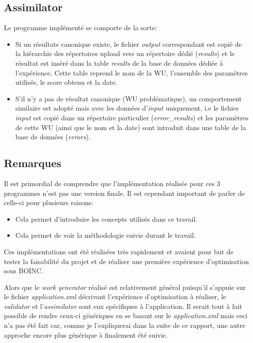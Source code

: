 \documentclass[a4paper, 11pt]{report}
\begin{document}
\subsection{Assimilator}
Le programme implémenté se comporte de la sorte:
\begin{itemize}
\item Si un résultats canonique existe, le fichier \textit{output} correspondant est copié de la hiérarchie des répertoires upload vers un répertoire dédié (\textit{results}) et le résultat est inséré dans la table \textit{results} de la base de données dédiée à l'expérience. Cette table reprend le nom de la WU, l'ensemble des paramètres utilisés, le score obtenu et la date. %
\item S'il n'y a pas de résultat canonique (WU problématique), un comportement similaire est adopté mais avec les données d'\textit{input} uniquement, i.e le fichier \textit{input} est copié dans un répertoire particulier (\textit{error\_results}) et les paramètres  de cette WU (ainsi que le nom et la date) sont introduit dans une table de la base de données (\textit{errors}).
\end{itemize}

\subsection{Remarques}
Il est primordial de comprendre que l'implémentation réalisée pour ces 3 programmes n'est pas une version finale. Il est cependant important de parler de celle-ci pour plusieurs raisons:
\begin{itemize}
\item Cela permet d'introduire les concepts utilisés dans ce travail.
\item Cela permet de voir la méthodologie suivie durant le travail. %
\end{itemize}

Ces implémentations ont été réalisées très rapidement et avaient pour but de tester la faisabilité du projet et de réaliser une première expérience d'optimisation sous \textsc{BOINC}.

Alors que le \textit{work generator} réalisé est relativement général puisqu'il s'appuie sur le fichier \textit{application.xml} décrivant l'expérience d'optimisation à réaliser, le \textit{validator} et l'\textit{assimilator} sont eux spécifiques à l'application. Il serait tout à fait possible de rendre ceux-ci génériques en se basant sur le \textit{application.xml} mais ceci n'a pas été fait car, comme je l'expliquerai dans la suite de ce rapport, une autre approche encore plus générique à finalement été suivie.
\end{document}
